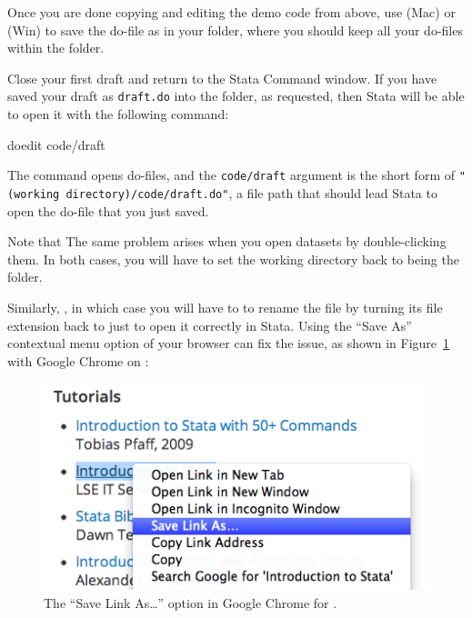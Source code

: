 Once you are done copying and editing the demo code from above, use  (Mac) or  (Win) to save the do-file as  in your \code folder, where you should keep all your do-files within the \SRQM folder.%

Close your first draft and return to the Stata Command window. If you have saved your draft as \texttt{draft.do} into the \code folder, as requested, then Stata will be able to open it with the following command:%

\begin{docspec}
	doedit code/draft
\end{docspec}

The  command opens do-files, and the \texttt{code/draft} argument is the short form of \texttt{"(working directory)/code/draft.do"}, a file path that should lead Stata to open the do-file that you just saved.%

Note that  The same problem arises when you open datasets by double-clicking them. In both cases, you will have to set the working directory back to being the \SRQM folder.%

Similarly, , in which case you will have to to rename the file by turning its file extension back to just  to open it correctly in Stata. Using the ``Save As'' contextual menu option of your browser can fix the issue, as shown in Figure~\ref{fig:save-as} with Google Chrome on \OSX:%

\begin{figure}
	\includegraphics[scale=.5]{images/macosx-save-as.png}
	\caption{The ``Save Link As…'' option in Google Chrome for \OSX.}
	\label{fig:save-as}
\end{figure}

